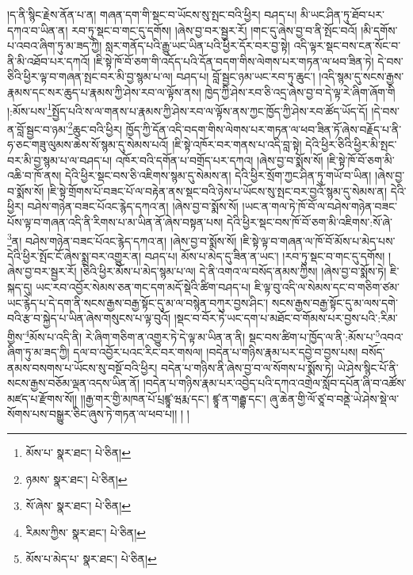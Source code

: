 །ད་ནི་སྙིང་རྗེས་ནོན་པ་ན། གཞན་དག་གི་སྡང་བ་ཡོངས་སུ་སྤང་བའི་ཕྱིར། བཤད་པ། མི་ཡང་ཤིན་ཏུ་ཐོབ་པར་དཀའ་བ་ཡིན་ན། རབ་ཏུ་སྡང་བ་གང་དུ་དགོས། །ཞེས་བྱ་བར་སྦྱར་རོ། །གང་དུ་ཞེས་བྱ་བ་ནི་སྤོང་བའོ། །མི་དགོས་པ་འབའ་ཞིག་ཏུ་མ་ཟད་ཀྱི། སླར་གནོད་པའི་རྒྱུ་ཡང་ཡིན་པའི་ཕྱིར་དོར་བར་བྱ་སྟེ། འདི་ལྟར་སྡང་བས་ངན་སོང་བ་ནི་མི་འཐོབ་པར་དཀའོ། །ཇི་སྟེ་ཁོ་བོ་ཅག་གི་འདོད་པའི་དོན་བདག་གིས་ལེགས་པར་གཏན་ལ་ཕབ་ཟིན་ཏེ། དེ་བས་ཅིའི་ཕྱིར་ལྟ་བ་གཞན་སྤང་བར་མི་བྱ་སྙམ་པ་ལ། བཤད་པ། བློ་སྦྱང་ཉམ་ཡང་རབ་ཏུ་ཆུང་། །འདི་སྙམ་དུ་སངས་རྒྱས་རྣམས་དང་སར་ཆུད་པ་རྣམས་ཀྱི་ཤེས་རབ་ལ་ལྟོས་ནས། ཁྱེད་ཀྱི་ཤེས་རབ་ཅི་འདྲ་ཞེས་བྱ་བ་དེ་ལྟ་རེ་ཞིག་ཞོག་གི །:མོས་པས་\footnote{མོས་པ་  སྣར་ཐང་།  པེ་ཅིན། }སྤྱོད་པའི་ས་ལ་གནས་པ་རྣམས་ཀྱི་ཤེས་རབ་ལ་ལྟོས་ནས་ཀྱང་ཁྱོད་ཀྱི་ཤེས་རབ་ཚོད་ཡོད་དོ། །དེ་བས་ན་བློ་སྦྱང་བ་ཉམ་\footnote{ཉམས་  སྣར་ཐང་།  པེ་ཅིན། }ཆུང་བའི་ཕྱིར། ཁྱོད་ཀྱི་དོན་འདི་བདག་གིས་ལེགས་པར་གཏན་ལ་ཕབ་ཟིན་ཏོ་ཞེས་བརྗོད་པ་ནི་ཧ་ཅང་གཟུ་ལུམས་ཆེས་སོ་སྙམ་དུ་སེམས་པའོ། །ཇི་སྟེ་འཁོར་བར་གནས་པ་འདི་བླ་སྟེ། དེའི་ཕྱིར་ཅིའི་ཕྱིར་མི་སྤང་བར་མི་བྱ་སྙམ་པ་ལ་བཤད་པ། འཁོར་བའི་དགོན་པ་བགྲོད་པར་དཀའ། །ཞེས་བྱ་བ་སྨོས་སོ། །ཇི་སྟེ་ཁོ་བོ་ཅག་མི་འཆི་བ་ཁོ་ནས། དེའི་ཕྱིར་སྡང་བས་ཅི་འཇིགས་སྙམ་དུ་སེམས་ན། དེའི་ཕྱིར་སྲོག་ཀྱང་ཤིན་ཏུ་གཡོ་བ་ཡིན། །ཞེས་བྱ་བ་སྨོས་སོ། །ཇི་སྟེ་གྲོགས་པོ་བཟང་པོ་ལ་བརྟེན་ནས་སྡང་བའི་ཉེས་པ་ཡོངས་སུ་སྤང་བར་བྱའོ་སྙམ་དུ་སེམས་ན། དེའི་ཕྱིར། བཤེས་གཉེན་བཟང་པོའང་རྙེད་དཀའ་ན། །ཞེས་བྱ་བ་སྨོས་སོ། །ཡང་ན་གལ་ཏེ་ཁོ་བོ་ལ་བཤེས་གཉེན་བཟང་པོས་ལྟ་བ་གཞན་འདི་ནི་རིགས་པ་མ་ཡིན་ནོ་ཞེས་བསྟན་པས། དེའི་ཕྱིར་སྡང་བས་ཁོ་བོ་ཅག་མི་འཇིགས་:སོ་ཞེ་\footnote{སོ་ཞེས་  སྣར་ཐང་།  པེ་ཅིན། }ན། བཤེས་གཉེན་བཟང་པོའང་རྙེད་དཀའ་ན། །ཞེས་བྱ་བ་སྨོས་སོ། །ཇི་སྟེ་ལྟ་བ་གཞན་ལ་ཁོ་བོ་མོས་པ་མེད་པས་དེའི་ཕྱིར་སྤོང་ངོ་ཞེས་སྨྲ་བར་འགྱུར་ན། བཤད་པ། མོས་པ་མེད་དུ་ཟིན་ན་ཡང་། །རབ་ཏུ་སྡང་བ་གང་དུ་དགོས། །ཞེས་བྱ་བར་སྦྱར་རོ། །ཅིའི་ཕྱིར་མོས་པ་མེད་སྙམ་པ་ལ། དེ་ནི་འགའ་ལ་བསོད་ནམས་ཀྱིས། །ཞེས་བྱ་བ་སྨོས་ཏེ། ཇི་སྐད་དུ། ཡང་རབ་འབྱོར་སེམས་ཅན་གང་དག་མདོ་སྡེའི་ཚིག་བཤད་པ། ཇི་ལྟ་བུ་འདི་ལ་སེམས་དང་བ་གཅིག་ཙམ་ཡང་རྙེད་པ་དེ་དག་ནི་སངས་རྒྱས་བརྒྱ་སྟོང་དུ་མ་ལ་བསྙེན་བཀུར་བྱས་ཤིང་། སངས་རྒྱས་བརྒྱ་སྟོང་དུ་མ་ལས་དགེ་བའི་རྩ་བ་སྐྱེད་པ་ཡིན་ཞེས་གསུངས་པ་ལྟ་བུའོ། །སྡང་བ་བོར་ཏེ་ཡང་དག་པ་མཐོང་བ་གོམས་པར་བྱས་པའི་:རིམ་གྱིས་\footnote{རིམས་ཀྱིས་  སྣར་ཐང་།  པེ་ཅིན། }མོས་པ་འདི་ནི། རེ་ཞིག་གཅིག་ན་འགྱུར་ཏེ་དེ་ལྟ་མ་ཡིན་ན་ནི། སྡང་བས་ཚིག་པ་ཁྱོད་ལ་ནི་:མོས་པ་\footnote{མོས་པ་མེད་པ་  སྣར་ཐང་།  པེ་ཅིན། }འབའ་ཞིག་ཏུ་མ་ཟད་ཀྱི། དལ་བ་འབྱོར་པའང་རིང་བར་གསལ། །བདེན་པ་གཉིས་རྣམ་པར་དབྱེ་བ་བྱས་པས། བསོད་ནམས་བསགས་པ་ཡོངས་སུ་བསྔོ་བའི་ཕྱིར། བདེན་པ་གཉིས་ནི་ཞེས་བྱ་བ་ལ་སོགས་པ་སྨོས་ཏེ། ཡེ་ཤེས་སྙིང་པོ་ནི་སངས་རྒྱས་བཅོམ་ལྡན་འདས་ཡིན་ནོ། །བདེན་པ་གཉིས་རྣམ་པར་འབྱེད་པའི་དཀའ་འགྲེལ་སློབ་དཔོན་ཞི་བ་འཚོས་མཛད་པ་རྫོགས་སོ།། །།རྒྱ་གར་གྱི་མཁན་པོ་པྲཛྙཱ་ཝརྨ་དང་། ཛྙཱ་ན་གརྦྷ་དང་། ཞུ་ཆེན་གྱི་ལོ་ཙཱ་བ་བནྡེ་ཡེ་ཤེས་སྡེ་ལ་སོགས་པས་བསྒྱུར་ཅིང་ཞུས་ཏེ་གཏན་ལ་ཕབ་པ།། །
།